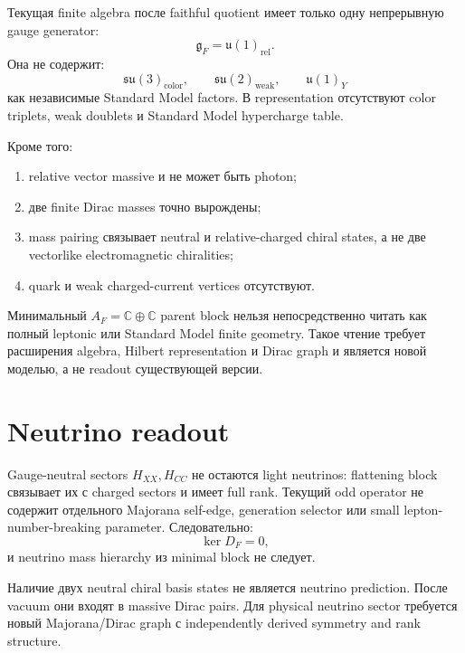 Текущая finite algebra после faithful quotient имеет только одну
непрерывную gauge generator:
\begin{equation}
 \mathfrak g_F=\mathfrak u(1)_{\mathrm{rel}}.
\end{equation}
Она не содержит:
\begin{equation}
 \mathfrak{su}(3)_{\mathrm{color}},
 \qquad
 \mathfrak{su}(2)_{\mathrm{weak}},
 \qquad
 \mathfrak u(1)_Y
\end{equation}
как независимые Standard Model factors. В representation отсутствуют
color triplets, weak doublets и Standard Model hypercharge table.

Кроме того:
\begin{enumerate}
 \item relative vector massive и не может быть photon;
 \item две finite Dirac masses точно вырождены;
 \item mass pairing связывает neutral и relative-charged chiral states,
 а не две vectorlike electromagnetic chiralities;
 \item quark и weak charged-current vertices отсутствуют.
\end{enumerate}

\begin{nogocriterion}
Минимальный \(A_F=\mathbb C\oplus\mathbb C\) parent block нельзя
непосредственно читать как полный leptonic или Standard Model finite
geometry. Такое чтение требует расширения algebra, Hilbert
representation и Dirac graph и является новой моделью, а не readout
существующей версии.
\end{nogocriterion}

\section{Neutrino readout}

Gauge-neutral sectors \(H_{XX},H_{CC}\) не остаются light neutrinos:
flattening block связывает их с charged sectors и имеет full rank.
Текущий odd operator не содержит отдельного Majorana self-edge,
generation selector или small lepton-number-breaking parameter.
Следовательно:
\begin{equation}
 \ker D_F=0,
\end{equation}
и neutrino mass hierarchy из minimal block не следует.

\begin{proposition}
Наличие двух neutral chiral basis states не является neutrino prediction.
После vacuum они входят в massive Dirac pairs. Для physical neutrino
sector требуется новый Majorana/Dirac graph с independently derived
symmetry and rank structure.
\end{proposition}


